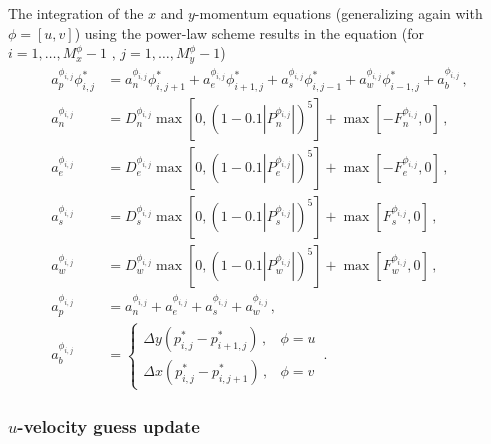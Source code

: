 \documentclass{article}
\begin{document}
The integration of the $x$ and $y$-momentum equations (generalizing again with $\phi = [u, v]$) using the power-law scheme results in the equation (for $i = 1, \ldots, M_x^\phi - 1\,\,,\, j = 1, \ldots, M_y^\phi - 1$)
\begin{subequations}
	\label{eq:power}
	\begin{align}
	a^{\phi_{i,j}}_p \phi^*_{i,j} & = a^{\phi_{i,j}}_n \phi^*_{i, j+1} + a^{\phi_{i,j}}_e \phi^*_{i+1, j} + a^{\phi_{i,j}}_s \phi^*_{i, j-1} + a^{\phi_{i,j}}_w \phi^*_{i-1, j} + a_b^{\phi_{i,j}}\,,\\
	a^{\phi_{i,j}}_n & = D^{\phi_{i,j}}_n \max \left[0, (1 - 0.1 |P^{\phi_{i,j}}_n|)^5\right] + \max \left[ -F^{\phi_{i,j}}_n, 0 \right]\,, \\
	a^{\phi_{i,j}}_e & = D^{\phi_{i,j}}_e \max \left[0, (1 - 0.1 |P^{\phi_{i,j}}_e|)^5\right] + \max \left[ -F^{\phi_{i,j}}_e, 0 \right]\,, \\
	a^{\phi_{i,j}}_s & = D^{\phi_{i,j}}_s \max \left[0, (1 - 0.1 |P^{\phi_{i,j}}_s|)^5\right] + \max \left[ F^{\phi_{i,j}}_s, 0 \right]\,, \\
	a^{\phi_{i,j}}_w & = D^{\phi_{i,j}}_w \max \left[0, (1 - 0.1 |P^{\phi_{i,j}}_w|)^5\right] + \max \left[ F^{\phi_{i,j}}_w, 0 \right]\,, \\
	a^{\phi_{i,j}}_p & = a^{\phi_{i,j}}_n + a^{\phi_{i,j}}_e + a^{\phi_{i,j}}_s + a^{\phi_{i,j}}_w\,, \\
	a^{\phi_{i,j}}_b & = \begin{cases}
	\Delta y (p^*_{i,j} - p^*_{i+1,j})\,, & \phi = u\\
	\Delta x (p^*_{i,j} - p^*_{i, j+1})\,, & \phi = v
	\end{cases}\,.
	\end{align}
\end{subequations}

\subsubsection{$u$-velocity guess update}
\end{document}
